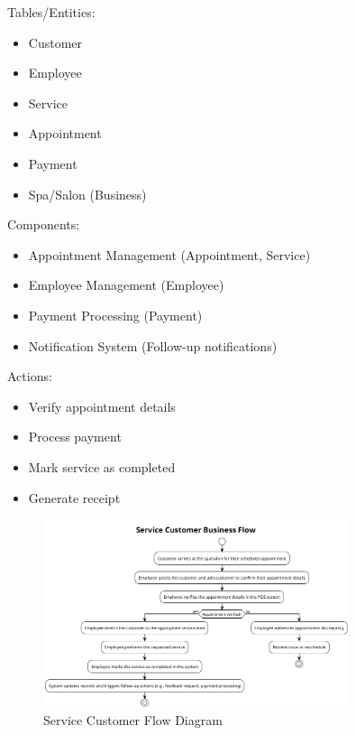\documentclass[]{VUMIFTemplateClass}
\begin{document}
Tables/Entities:
\begin{itemize}
    \setlength{\itemsep}{2pt}
    \setlength{\parskip}{0pt}
    \setlength{\parsep}{0pt}
    \item Customer
    \item Employee
    \item Service
    \item Appointment
    \item Payment
    \item Spa/Salon (Business)
\end{itemize}

Components:
\begin{itemize}
    \setlength{\itemsep}{2pt}
    \setlength{\parskip}{0pt}
    \setlength{\parsep}{0pt}
    \item Appointment Management (Appointment, Service)
    \item Employee Management (Employee)
    \item Payment Processing (Payment)
    \item Notification System (Follow-up notifications)
\end{itemize}

Actions:
\begin{itemize}
    \setlength{\itemsep}{2pt}
    \setlength{\parskip}{0pt}
    \setlength{\parsep}{0pt}
    \item Verify appointment details
    \item Process payment
    \item Mark service as completed
    \item Generate receipt
\end{itemize}

\begin{figure}[H]
    \centering
    \includegraphics[width=0.8\textwidth]{images/diagrams/services/service_customer_flow.png}
    \caption{Service Customer Flow Diagram}
    \label{fig:service_customer_flow}
\end{figure}
\end{document}
